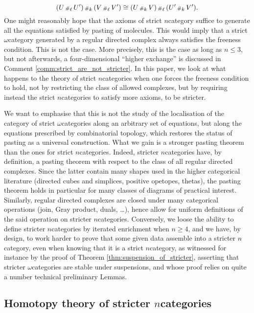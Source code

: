 \begin{equation*}
    (U \,{\scriptstyle\#}_{\ell}\, U') \,{\scriptstyle\#}_{k}\, (V \,{\scriptstyle\#}_{\ell}\, V') \cong (U \,{\scriptstyle\#}_{k}\, V) \,{\scriptstyle\#}_{\ell}\, (U' \,{\scriptstyle\#}_{k}\, V').
\end{equation*}
One might reasonably hope that the axioms of strict \( n \)\nbd category suffice to generate all the equations satisfied by pasting of molecules.
This would imply that a strict \( \omega \)\nbd category generated by a regular directed complex always satisfies the freeness condition. 
This is not the case.
More precisely, this is the case as long as \( n \le 3 \), but not afterwards, a four-dimensional ``higher exchange'' is discussed in Comment \ref{comm:strict_are_not_stricter}.
In this paper, we look at what happens to the theory of strict \( n \)\nbd categories when one forces the freeness condition to hold, not by restricting the class of allowed complexes, but by requiring instead the strict \( n \)\nbd categories to satisfy more axioms, to be stricter.

We want to emphasise that this is not the study of the localisation of the category of strict \( \omega \)\nbd categories along an arbitrary set of equations, but along the equations prescribed by combinatorial topology, which restores the status of pasting as a universal construction.
What we gain is a stronger pasting theorem than the ones for strict \( n \)\nbd categories.
Indeed, stricter \( n \)\nbd categories have, by definition, a pasting theorem with respect to the class of all regular directed complexes. 
Since the latter contain many shapes used in the higher categorical literature (directed cubes and simplices, positive opetopes, thetas), the pasting theorem holds in particular for many classes of diagrams of practical interest.   
Similarly, regular directed complexes are closed under many categorical operations (join, Gray product, duals, \dots), hence allow for uniform definitions of the said operation on stricter \( n \)\nbd categories.
Conversely, we loose the ability to define stricter \( n \)\nbd categories by iterated enrichment when \( n \geq 4 \), and we have, by design, to work harder to prove that some given data assemble into a stricter \( n \)\nbd category, even when knowing that it is a strict \( n \)\nbd category, as witnessed for instance by the proof of Theorem \ref{thm:suspension_of_stricter}, asserting that stricter \( \omega \)\nbd categories are stable under suspensions, and whose proof relies on quite a number technical preliminary Lemmas.  

\subsection*{Homotopy theory of stricter \( n \)\nbd categories}

